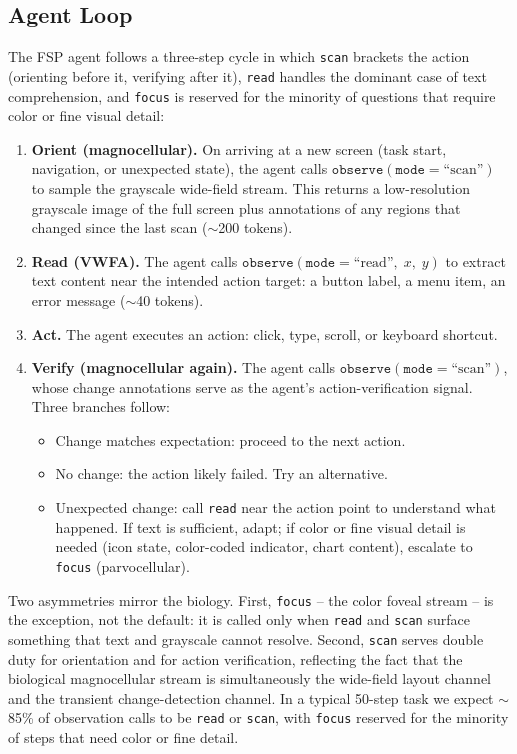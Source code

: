 \documentclass[11pt,a4paper]{article}
\begin{document}
\subsection{Agent Loop}
\label{sec:agent-loop}

The FSP agent follows a three-step cycle in which \texttt{scan} brackets the
action (orienting before it, verifying after it), \texttt{read} handles the
dominant case of text comprehension, and \texttt{focus} is reserved for the
minority of questions that require color or fine visual detail:

\begin{enumerate}[leftmargin=*,itemsep=2pt]
  \item \textbf{Orient (magnocellular).} On arriving at a new screen (task
    start, navigation, or unexpected state), the agent calls
    $\texttt{observe}(\texttt{mode}{=}\text{``scan''})$ to sample the
    grayscale wide-field stream. This returns a low-resolution grayscale
    image of the full screen plus annotations of any regions that changed
    since the last scan ($\sim$200 tokens).
  \item \textbf{Read (VWFA).} The agent calls
    $\texttt{observe}(\texttt{mode}{=}\text{``read''},\; x,\; y)$ to extract
    text content near the intended action target: a button label, a menu item,
    an error message ($\sim$40 tokens).
  \item \textbf{Act.} The agent executes an action: click, type, scroll, or
    keyboard shortcut.
  \item \textbf{Verify (magnocellular again).} The agent calls
    $\texttt{observe}(\texttt{mode}{=}\text{``scan''})$, whose change
    annotations serve as the agent's action-verification signal. Three
    branches follow:
    \begin{itemize}[itemsep=1pt]
      \item Change matches expectation: proceed to the next action.
      \item No change: the action likely failed. Try an alternative.
      \item Unexpected change: call \texttt{read} near the action point to
        understand what happened. If text is sufficient, adapt; if color or
        fine visual detail is needed (icon state, color-coded indicator,
        chart content), escalate to \texttt{focus} (parvocellular).
    \end{itemize}
\end{enumerate}

\noindent
Two asymmetries mirror the biology. First, \texttt{focus} -- the color foveal
stream -- is the exception, not the default: it is called only when
\texttt{read} and \texttt{scan} surface something that text and grayscale
cannot resolve. Second, \texttt{scan} serves double duty for orientation and
for action verification, reflecting the fact that the biological magnocellular
stream is simultaneously the wide-field layout channel and the transient
change-detection channel. In a typical 50-step task we expect $\sim$85\% of
observation calls to be \texttt{read} or \texttt{scan}, with \texttt{focus}
reserved for the minority of steps that need color or fine detail.
\end{document}
